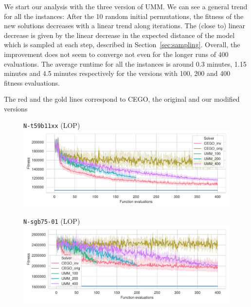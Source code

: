 \documentclass[sigconf,dvipsnames]{acmart}
\begin{document}
We start our analysis with the three version of UMM. We can see a general trend for all the instances: After the 10 random initial permutations, the fitness of the new solutions decreases with a linear trend along iterations. The (close to) linear decrease is given by the linear decrease in the expected distance of the model which is sampled at each step, described in Section~\ref{sec:sampling}. Overall, the improvement does not seem to converge not even for the longer runs of 400 evaluations.
The average runtime for all the instances is around 0.3 minutes, 1.15 minutes and 4.5 minutes respectively for the  versions with 100, 200 and 400 fitness evaluations. 


The red and the gold lines correspond to CEGO, the original and our modified versions

\begin{figure}[tb]
\small
\centering%
\begin{minipage}{0.49\linewidth}
  \texttt{N-t59b11xx} (LOP)\\[-0.5ex]
  \includegraphics[width=\textwidth]{../img/fitness_lop_IO_N-t59b11xx}
\end{minipage}
\begin{minipage}{0.49\linewidth}
  \texttt{N-sgb75-01} (LOP)\\[-0.5ex]
  \includegraphics[width=\textwidth]{../img/fitness_lop_SGB_N-sgb75_02}
\end{minipage}
\\
\begin{minipage}{0.49\linewidth}

\end{minipage}
\end{figure}
\end{document}
